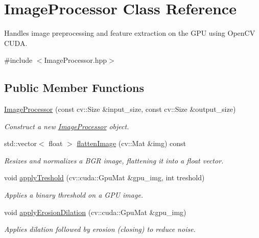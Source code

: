 \hypertarget{classImageProcessor}{}\section{Image\+Processor Class Reference}
\label{classImageProcessor}


Handles image preprocessing and feature extraction on the G\+PU using Open\+CV C\+U\+DA.  




{\ttfamily \#include $<$Image\+Processor.\+hpp$>$}

\subsection*{Public Member Functions}
\begin{DoxyCompactItemize}
\item 
\hyperlink{classImageProcessor_af52cf1abf1dacffda01cc55b6f5c8313}{Image\+Processor} (const cv\+::\+Size \&input\+\_\+size, const cv\+::\+Size \&output\+\_\+size)
\begin{DoxyCompactList}\small\item\em Construct a new \hyperlink{classImageProcessor}{Image\+Processor} object. \end{DoxyCompactList}\item 
std\+::vector$<$ float $>$ \hyperlink{classImageProcessor_a9e6ce929aa19b3dc53d855ce0f68a2f6}{flatten\+Image} (cv\+::\+Mat \&img) const
\begin{DoxyCompactList}\small\item\em Resizes and normalizes a B\+GR image, flattening it into a float vector. \end{DoxyCompactList}\item 
void \hyperlink{classImageProcessor_a6bce7d61162f71ae9bb322b40c9990ab}{apply\+Treshold} (cv\+::cuda\+::\+Gpu\+Mat \&gpu\+\_\+img, int treshold)
\begin{DoxyCompactList}\small\item\em Applies a binary threshold on a G\+PU image. \end{DoxyCompactList}\item 
void \hyperlink{classImageProcessor_a358c5380af94e810845282f05579265a}{apply\+Erosion\+Dilation} (cv\+::cuda\+::\+Gpu\+Mat \&gpu\+\_\+img)
\begin{DoxyCompactList}\small\item\em Applies dilation followed by erosion (closing) to reduce noise. \end{DoxyCompactList}\item 

\end{DoxyCompactItemize}
